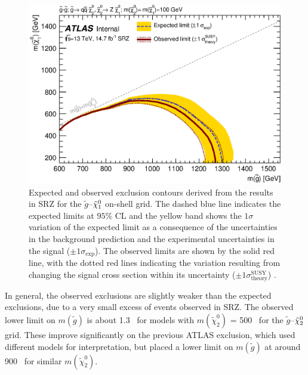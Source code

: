 \begin{figure}[!htb]
\centering
\includegraphics[width=.8\textwidth]{figures/interpretation/excl_SM_GG_N2.eps}
\caption{
Expected and observed exclusion contours derived from the results in SRZ for the $\tilde{g}$--$\tilde{\chi}_1^0$ on-shell grid. 
The dashed blue line indicates the expected limits at $95\%$ CL and the yellow band shows the $1\sigma$ variation of the expected limit as a consequence of the uncertainties in the background prediction and the experimental uncertainties in the signal ($\pm1\sigma_\text{exp}$). 
The observed limits are shown by the solid red line, with the dotted red lines indicating the variation resulting from changing the signal cross section within its uncertainty ($\pm1\sigma^\text{SUSY}_\text{theory}$) \cite{this_paper}.
\label{fig:excl_SMGGN2}
}
\end{figure}

In general, the observed exclusions are slightly weaker than the expected exclusions, due to a very small excess of events observed in SRZ. The observed lower limit on $m(\tilde{g})$ is about 1.3 \tev~for models with $m(\tilde{\chi}^{0}_{2})$ = 500 \gev~for the $\tilde{g}$--$\tilde{\chi}_2^0$ grid. These improve significantly on the previous \ac{ATLAS} exclusion, which used different models for interpretation, but placed a lower limit on $m(\tilde{g})$ at around 900 \gev~for similar $m(\tilde{\chi}^{0}_{2})$. 



